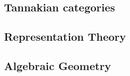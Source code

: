 \subsection{Tannakian categories}

\subsection{Representation Theory}

\subsection{Algebraic Geometry}
